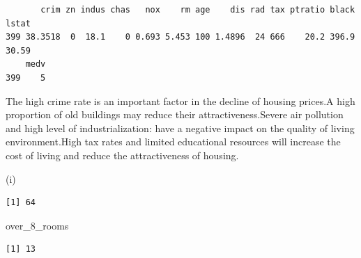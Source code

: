 \documentclass[
]{article}
\newenvironment{Shaded}{\begin{snugshade}}{\end{snugshade}}
\newcommand{\DecValTok}[1]{\textcolor[rgb]{0.68,0.00,0.00}{#1}}
\newcommand{\FunctionTok}[1]{\textcolor[rgb]{0.28,0.35,0.67}{#1}}
\newcommand{\NormalTok}[1]{\textcolor[rgb]{0.00,0.23,0.31}{#1}}
\newcommand{\OtherTok}[1]{\textcolor[rgb]{0.00,0.23,0.31}{#1}}
\newcommand{\SpecialCharTok}[1]{\textcolor[rgb]{0.37,0.37,0.37}{#1}}
\begin{document}
\begin{verbatim}
       crim zn indus chas   nox    rm age    dis rad tax ptratio black lstat
399 38.3518  0  18.1    0 0.693 5.453 100 1.4896  24 666    20.2 396.9 30.59
    medv
399    5
\end{verbatim}

The high crime rate is an important factor in the decline of housing
prices.A high proportion of old buildings may reduce their
attractiveness.Severe air pollution and high level of industrialization:
have a negative impact on the quality of living environment.High tax
rates and limited educational resources will increase the cost of living
and reduce the attractiveness of housing.

(i)

\begin{Shaded}
\end{Shaded}

\begin{verbatim}
[1] 64
\end{verbatim}

\begin{Shaded}
\begin{Highlighting}[]
\NormalTok{over\_8\_rooms}
\end{Highlighting}
\end{Shaded}

\begin{verbatim}
[1] 13
\end{verbatim}

\begin{Shaded}
\end{Shaded}
\end{document}
